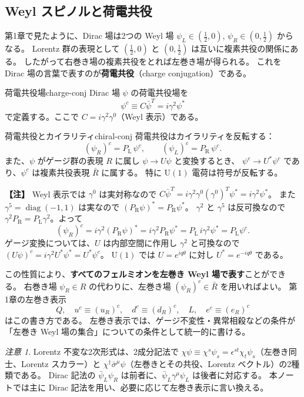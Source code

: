 \documentclass[uplatex,dvipdfmx,a4paper,11pt,openany]{jsbook}
\newcommand{\term}[2]{\textbf{#1}（#2）}
\newenvironment{note}{\vspace{1ex}\par\footnotesize\noindent\textbf{【注】}}{\par\vspace{1ex}}
\numberwithin{equation}{chapter}
\theoremstyle{definition}
\theoremstyle{plain}
\theoremstyle{remark}
\newtheorem{remark}{注意}[chapter]
\newcommand{\U}{\mathrm{U}}
\newcommand{\diag}{\operatorname{diag}}
\newcommand{\PL}{P_{\mathrm{L}}}
\newcommand{\PR}{P_{\mathrm{R}}}
\begin{document}
\subsection{Weyl スピノルと荷電共役}
第1章で見たように、Dirac 場は2つの Weyl 場 $\psi_L\in(\frac12,0)$, $\psi_R\in(0,\frac12)$ からなる。
Lorentz 群の表現として $(\frac12,0)$ と $(0,\frac12)$ は互いに複素共役の関係にある。
したがって右巻き場の複素共役をとれば左巻き場が得られる。
これを Dirac 場の言葉で表すのが\term{荷電共役}{charge conjugation}である。
\begin{mydef}{荷電共役場}{charge-conj}
Dirac 場 $\psi$ の荷電共役場を
\begin{equation}
\psi^c\equiv C\bar\psi^T=i\gamma^2\psi^*
\end{equation}
で定義する。ここで $C=i\gamma^2\gamma^0$（Weyl 表示）である。
\end{mydef}
\begin{myprop}{荷電共役とカイラリティ}{chiral-conj}
荷電共役はカイラリティを反転する：
\begin{equation}
(\psi_R)^c=\PL\,\psi^c,
\qquad
(\psi_L)^c=\PR\,\psi^c .
\end{equation}
また、$\psi$ がゲージ群の表現 $R$ に属し $\psi\to U\psi$ と変換するとき、
$\psi^c\to U^*\psi^c$ であり、$\psi^c$ は複素共役表現 $\bar R$ に属する。
特に $\U(1)$ 電荷は符号が反転する。
\end{myprop}
\begin{note}
Weyl 表示では $\gamma^0$ は実対称なので $C\bar\psi^T=i\gamma^2\gamma^0(\gamma^0)^T\psi^*=i\gamma^2\psi^*$。
また $\gamma^5=\diag(-1,1)$ は実なので $(\PR\psi)^*=\PR\psi^*$。
$\gamma^2$ と $\gamma^5$ は反可換なので $\gamma^2\PR=\PL\gamma^2$。よって
\[
(\psi_R)^c=i\gamma^2(\PR\psi)^*=i\gamma^2\PR\psi^*=\PL\,i\gamma^2\psi^*=\PL\psi^c .
\]
ゲージ変換については、$U$ は内部空間に作用し $\gamma^2$ と可換なので
$(U\psi)^c=i\gamma^2U^*\psi^*=U^*\psi^c$。
$\U(1)$ では $U=e^{iq\theta}$ に対し $U^*=e^{-iq\theta}$ である。
\end{note}
この性質により、\textbf{すべてのフェルミオンを左巻き Weyl 場で表す}ことができる。
右巻き場 $\psi_R\in R$ の代わりに、左巻き場 $(\psi_R)^c\in\bar R$ を用いればよい。
第1章の左巻き表示
\begin{equation}
Q,\quad u^c\equiv(u_R)^c,\quad d^c\equiv(d_R)^c,\quad L,\quad e^c\equiv(e_R)^c
\end{equation}
はこの書き方である。
左巻き表示では、ゲージ不変性・異常相殺などの条件が
「左巻き Weyl 場の集合」についての条件として統一的に書ける。
\begin{remark}
Lorentz 不変な2次形式は、2成分記法で
$\chi\psi\equiv\chi^s\psi_s=\epsilon^{st}\chi_t\psi_s$（左巻き同士、Lorentz スカラー）と
$\chi^\dagger\bar\sigma^\mu\psi$（左巻きとその共役、Lorentz ベクトル）の2種類である。
Dirac 記法の $\bar\psi_L\psi_R$ は前者に、$\bar\psi_L\gamma^\mu\psi_L$ は後者に対応する。
本ノートでは主に Dirac 記法を用い、必要に応じて左巻き表示に言い換える。
\end{remark}
\end{document}
